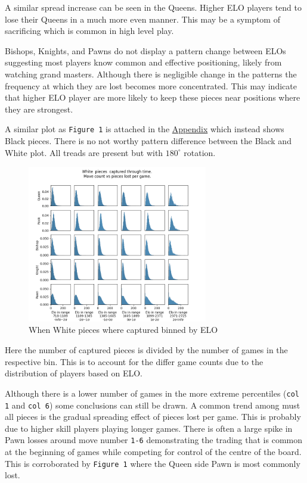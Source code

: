 \documentclass[11pt]{article}
\begin{document}
A similar spread increase can be seen in the Queens. Higher ELO players tend to lose their Queens in a much more even manner. This may be a symptom of sacrificing which is common in high level play.

Bishops, Knights, and Pawns do not display a pattern change between ELOs suggesting most players know common and effective positioning, likely from watching grand masters. Although there is negligible change in the patterns the frequency at which they are lost becomes more concentrated. This may indicate that higher ELO player are more likely to keep these pieces near positions where they are strongest.


A similar plot as \texttt{Figure 1} is attached in the \hyperref[sec:org4712c24]{Appendix} which instead shows Black pieces. There is no not worthy pattern difference between the Black and White plot. All treads are present but with \(180^{\circ}\) rotation.

\begin{figure}[htbp]
\centering
\includegraphics[width=0.7\textwidth]{Images/_HIST_Queen_Rook_Bishop_Knight_Pawn_WHITE_ELO.png}
\caption{When White pieces where captured binned by ELO}
\end{figure}

Here the number of captured pieces is divided by the number of games in the respective bin. This is to account for the differ game counts due to the distribution of players based on ELO.

Although there is a lower number of games in the more extreme percentiles (\texttt{col 1} and \texttt{col 6}) some conclusions can still be drawn.
A common trend among must all pieces is the gradual spreading effect of pieces lost per game. This is probably due to higher skill players playing longer games.
There is often a large spike in Pawn losses around move number \texttt{1-6} demonstrating the trading that is common at the beginning of games while competing for control of the centre of the board. This is corroborated by \texttt{Figure 1} where the Queen side Pawn is most commonly lost.
\end{document}
